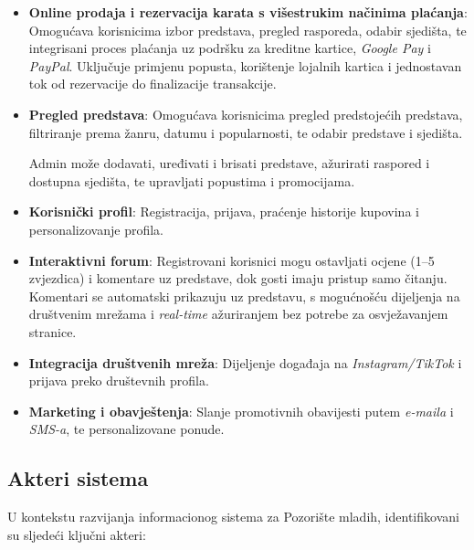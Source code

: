 \begin{itemize}
    \item \textbf{Online prodaja i rezervacija karata s višestrukim načinima plaćanja}: Omogućava korisnicima izbor predstava, pregled rasporeda, odabir sjedišta, te integrisani proces plaćanja uz podršku za kreditne kartice, \emph{Google Pay} i \emph{PayPal}. Uključuje primjenu popusta, korištenje lojalnih kartica i jednostavan tok od rezervacije do finalizacije transakcije.

    \item \textbf{Pregled predstava}:
    Omogućava korisnicima pregled predstojećih predstava, filtriranje prema žanru, datumu i popularnosti, te odabir predstave i sjedišta.

    Admin može dodavati, uređivati i brisati predstave, ažurirati raspored i dostupna sjedišta, te upravljati popustima i promocijama.

    \item \textbf{Korisnički profil}: Registracija, prijava, praćenje historije kupovina i personalizovanje profila.

    \item \textbf{Interaktivni forum}: Registrovani korisnici mogu ostavljati ocjene (1–5 zvjezdica) i komentare uz predstave, dok gosti imaju pristup samo čitanju. Komentari se automatski prikazuju uz predstavu, s mogućnošću dijeljenja na društvenim mrežama i \emph{real-time} ažuriranjem bez potrebe za osvježavanjem stranice.  

    \item \textbf{Integracija društvenih mreža}: Dijeljenje događaja na \emph{Instagram/TikTok} i prijava preko društevnih profila.

    \item \textbf{Marketing i obavještenja}: Slanje promotivnih obavijesti putem \emph{e-maila} i \emph{SMS-a}, te personalizovane ponude.
\end{itemize}

\subsection{Akteri sistema}
U kontekstu razvijanja informacionog sistema za Pozorište mladih, identifikovani su sljedeći ključni akteri:

